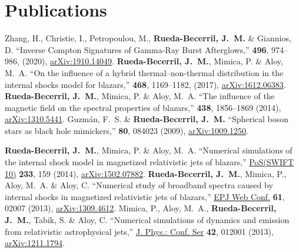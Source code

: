 \section{Publications}

\renewcommand{\refname}{Articles}
\setcounter{num}{0}
\renewcommand{\MyNbOfPub}{4}  
\renewcommand*{\bibliographyitemlabel}{[\arabic{enumiv}]}
\begin{thebibliography}{99}
   Zhang, H., Christie, I., Petropoulou, M., \textbf{Rueda-Becerril, J.~M.} \& Giannios, D. ``Inverse Compton Signatures of Gamma-Ray Burst Afterglows,'' \href{https://doi.org/10.1093/mnras/staa1583}{\mnras} \textbf{496}, 974--986, (2020), \href{https://arxiv.org/abs/1910.14049}{arXiv:1910.14049}.
   \textbf{Rueda-Becerril, J.~M.}, Mimica, P. \& Aloy, M.~A. ``On the influence of a hybrid thermal--non-thermal distribution in the internal shocks model for blazars,'' \href{https://doi.org/10.1093/mnras/stx476}{\mnras} \textbf{468}, 1169--1182, (2017), \href{https://arxiv.org/abs/1612.06383}{arXiv:1612.06383}.
   \textbf{Rueda-Becerril, J.~M.}, Mimica, P. \& Aloy, M.~A. ``The influence of the magnetic field on the spectral properties of blazars,'' \href{https://doi.org/10.1093/mnras/stt2335}{\mnras} \textbf{438}, 1856--1869 (2014), \href{https://arxiv.org/abs/1310.5441}{arXiv:1310.5441}.
   Guzm{\'a}n, F.~S. \& \textbf{Rueda-Becerril, J.~M.} ``Spherical boson stars as black hole mimickers,''  \href{https://doi.org/10.1103/PhysRevD.80.084023}{\prd} \textbf{80}, 084023 (2009), \href{https://arxiv.org/abs/1009.1250}{arXiv:1009.1250}.
\end{thebibliography}
\renewcommand{\refname}{Proceedings}
\setcounter{num}{0}
\renewcommand{\MyNbOfPub}{3}
\renewcommand*{\bibliographyitemlabel}{\arabic{enumiv}.}
\begin{thebibliography}{99}
   \textbf{Rueda-Becerril, J.~M.}, Mimica, P. \& Aloy, M.~A. ``Numerical simulations of the internal shock model in magnetized relativistic jets of blazars,'' \href{https://doi.org/10.22323/1.233.0159}{PoS(SWIFT 10)} \textbf{233}, 159 (2014), \href{https://arxiv.org/abs/1502.07882}{arXiv:1502.07882}.
   \textbf{Rueda-Becerril, J.~M.}, Mimica, P., Aloy, M.~A. \& Aloy, C. ``Numerical study of broadband spectra caused by internal shocks in magnetized relativistic jets of blazars,'' \href{https://doi.org/10.1051/epjconf/20136102007}{EPJ Web Conf.} \textbf{61}, 02007 (2013), \href{https://arxiv.org/abs/1309.4612}{arXiv:1309.4612}.
   Mimica, P., Aloy, M.~A., \textbf{Rueda-Becerril, J.~M.}, Tabik, S. \& Aloy, C. ``Numerical simulations of dynamics and emission from relativistic astrophysical jets,'' \href{https://doi.org/10.1088/1742-6596/454/1/012001}{J. Phys.: Conf. Ser} \textbf{42}, 012001 (2013), \href{https://arxiv.org/abs/1211.1794}{arXiv:1211.1794}.
\end{thebibliography}


